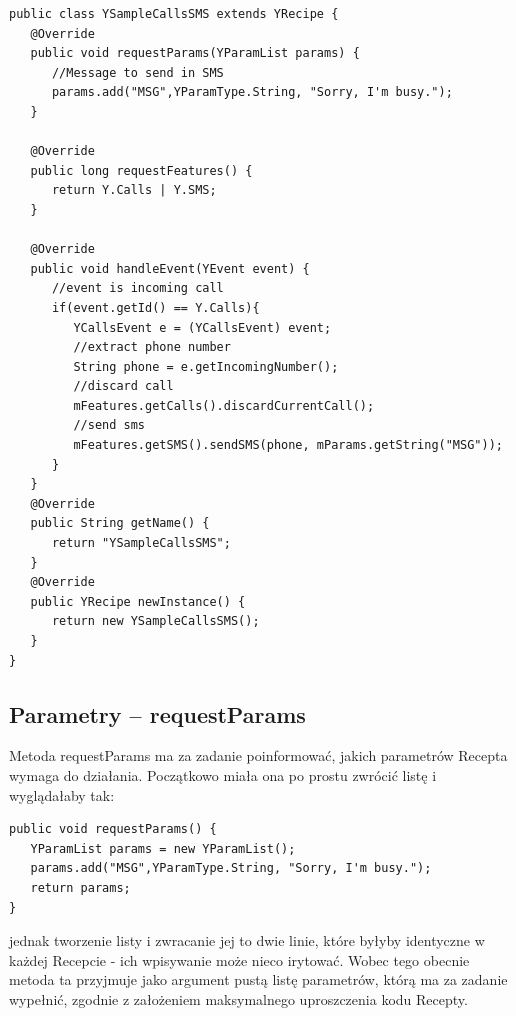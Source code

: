 \documentclass[11pt,a4paper,polish,thesis]{dcsbook}
\begin{document}
\begin{verbatim}
public class YSampleCallsSMS extends YRecipe {
   @Override
   public void requestParams(YParamList params) {
      //Message to send in SMS
      params.add("MSG",YParamType.String, "Sorry, I'm busy.");
   }

   @Override
   public long requestFeatures() {
      return Y.Calls | Y.SMS;
   }

   @Override
   public void handleEvent(YEvent event) {
      //event is incoming call
      if(event.getId() == Y.Calls){
         YCallsEvent e = (YCallsEvent) event;
         //extract phone number
         String phone = e.getIncomingNumber();
         //discard call
         mFeatures.getCalls().discardCurrentCall();
         //send sms
         mFeatures.getSMS().sendSMS(phone, mParams.getString("MSG"));
      }
   }
   @Override
   public String getName() {
      return "YSampleCallsSMS";
   }
   @Override
   public YRecipe newInstance() {
      return new YSampleCallsSMS();
   }
}
\end{verbatim}
\subsection{Parametry -- requestParams}
Metoda requestParams ma za zadanie poinformować, jakich parametrów Recepta wymaga do działania. Początkowo miała ona po prostu zwrócić listę i wyglądałaby tak:
\begin{verbatim}
public void requestParams() {
   YParamList params = new YParamList();
   params.add("MSG",YParamType.String, "Sorry, I'm busy.");
   return params;
}
\end{verbatim}
jednak tworzenie listy i zwracanie jej to dwie linie, które byłyby identyczne w każdej Recepcie - ich wpisywanie może nieco irytować. Wobec tego obecnie metoda ta przyjmuje jako argument pustą listę parametrów, którą ma za zadanie wypełnić, zgodnie z założeniem maksymalnego uproszczenia kodu Recepty.
\end{document}
